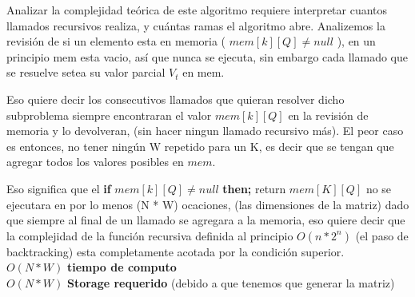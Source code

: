 \documentclass[fleqn, 11pt]{article}
\begin{document}
Analizar la complejidad teórica de este algoritmo requiere interpretar cuantos llamados recursivos realiza, y cuántas ramas el algoritmo abre. Analizemos la revisión de si un elemento esta en memoria ( $mem[k][Q] \neq null$ ), en un principio mem esta vacio,  así que nunca se ejecuta, sin embargo cada llamado que se resuelve setea su valor parcial \textit{$V_t$} en mem.

Eso quiere decir los consecutivos llamados que quieran resolver dicho subproblema siempre encontraran el valor $mem[k][Q]$ en la revisión de memoria y lo devolveran, (sin hacer ningun llamado recursivo más). El peor caso es entonces, no tener ningún W repetido para un K, es decir que se tengan que agregar todos los valores posibles en $mem$.

Eso significa que el \textbf{if} $mem[k][Q] \neq null$ \textbf{then;} return $mem[K][Q]$ no se ejecutara en por lo menos (N * W) ocaciones, (las dimensiones de la matriz) dado que siempre al final de un llamado se agregara a la memoria, eso quiere decir que la complejidad de la función recursiva definida al principio $O(n*2^n)$ (el paso de backtracking) esta completamente acotada por la condición superior. \\

\small $O(N * W)$ \textbf{ tiempo de computo} \\
\small $O(N * W)$ \textbf{ Storage requerido} (debido a que tenemos que generar la matriz) \\
\end{document}
